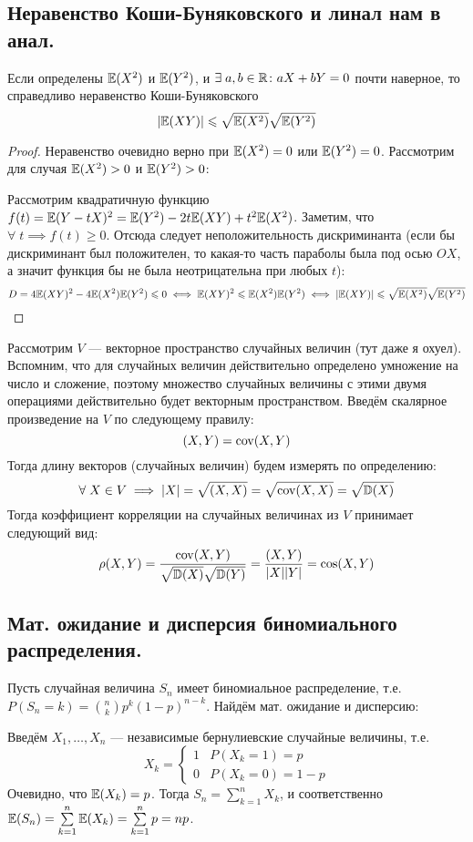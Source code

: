 \subsection{Неравенство Коши-Буняковского и линал нам в анал.}
\begin{proposal}
    Если определены $\mathbb{E}(X^2)$ и $\mathbb{E}(Y^2)$, и $\exists\; a, b\in \mathbb{R} \colon aX + bY = 0$ почти наверное, то
    справедливо неравенство Коши-Буняковского
    \[
        |\mathbb{E}(XY)| \leqslant \sqrt{\mathbb{E}(X^2)}\sqrt{\mathbb{E}(Y^2)}
    \]
\end{proposal}
\begin{proof}
    Неравенство очевидно верно при $\mathbb{E}(X^2) = 0$ или $\mathbb{E}(Y^2) = 0$. Рассмотрим для случая $\mathbb{E}(X^2) > 0$ и
    $\mathbb{E}(Y^2) > 0$:

    Рассмотрим квадратичную функцию $f(t) = \mathbb{E}(Y - tX)^2 = \mathbb{E}(Y^2) - 2t\mathbb{E}(XY) + t^2\mathbb{E}(X^2)$. Заметим, что
    $\forall\; t \implies f(t) \geq 0$. Отсюда следует неположительность дискриминанта (если бы дискриминант
    был положителен, то какая-то часть параболы была под осью $OX$, а значит функция бы не была неотрицательна
    при любых $t$):
    \[
        D = 4\mathbb{E}(XY)^2 - 4\mathbb{E}(X^2)\mathbb{E}(Y^2) \leqslant 0 \iff
        \mathbb{E}(XY)^2 \leqslant \mathbb{E}(X^2)\mathbb{E}(Y^2) \iff
        |\mathbb{E}(XY)| \leqslant \sqrt{\mathbb{E}(X^2)}\sqrt{\mathbb{E}(Y^2)}
    \]
\end{proof}

Рассмотрим $V$ --- векторное пространство случайных величин (тут даже я охуел). Вспомним, что для случайных величин
действительно определено умножение на число и сложение, поэтому множество случайных величины с этими
двумя операциями действительно будет векторным пространством. Введём скалярное произведение на $V$ по следующему
правилу:
\[
    (X, Y) = \operatorname{\mathop{\mathrm{cov}}}(X, Y)
\]
Тогда длину векторов (случайных величин) будем измерять по определению:
\[
    \forall\;X \in V \implies |X| = \sqrt{(X, X)} = \sqrt{\operatorname{\mathop{\mathrm{cov}}}(X, X)} = \sqrt{\mathbb{D}(X)}
\]
Тогда коэффициент корреляции на случайных величинах из $V$ принимает следующий вид:
\[
    \rho(X, Y) = \frac{\operatorname{\mathop{\mathrm{cov}}}(X, Y)}{\sqrt{\mathbb{D}(X)}\sqrt{\mathbb{D}(Y)}} =
    \frac{(X, Y)}{|X||Y|} = \cos(X, Y)
\]

\subsection{Мат. ожидание и дисперсия биномиального распределения.}
Пусть случайная величина $S_n$ имеет биномиальное распределение, т.е. $P(S_n = k) = \binom{n}{k}p^k(1 - p)^{n-k}$.
Найдём мат. ожидание и дисперсию:

Введём $X_1, \ldots, X_n$ --- независимые бернулиевские случайные величины, т.е.
\[
    X_k =
    \begin{cases}
        1 & P(X_k = 1) = p\\
        0 & P(X_k = 0) = 1 - p
    \end{cases}
\]
Очевидно, что $\mathbb{E}(X_k) = p$. Тогда $S_n = \sum\limits_{k = 1}^n X_k$, и соответственно
$\mathbb{E}(S_n) = \sum\limits_{k = 1}^n \mathbb{E}(X_k) = \sum\limits_{k = 1}^n p = np$.

